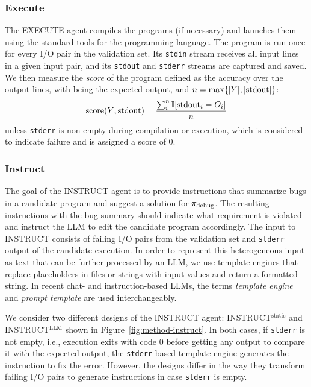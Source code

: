 \subsubsection{Execute}
\label{sec:seidr-execute}


The EXECUTE agent compiles the programs (if necessary) and launches them using the standard tools for the programming language.
The program is run once for every I/O pair in the validation set. 
Its \texttt{stdin} stream receives all input lines in a given input pair, and its \texttt{stdout} and \texttt{stderr} streams are captured and saved.
We then measure the \emph{score} of the program defined as the accuracy over the output lines, with \expoutputvec{} being the expected output, and $n=\max\{|Y{}|, |\text{stdout}|\}$:
\[    
\text{score}(Y{}, \text{stdout}) = \frac{\sum^{n}_i{\mathbb{I}[\text{stdout}_i = O_i]}}{n} 
\]
unless \texttt{stderr} is non-empty during compilation or execution, which is considered to indicate failure and is assigned a score of 0.

\subsubsection{Instruct}
\label{sec:seidr-instruct}

The goal of the INSTRUCT agent is to provide instructions that summarize bugs in a candidate program and suggest a solution for $ \pi_\text{debug} $. 
The resulting instructions with the bug summary should indicate what requirement is violated and instruct the LLM to edit the candidate program accordingly. 
The input to INSTRUCT consists of failing I/O pairs from the validation set and \texttt{stderr} output of the candidate execution. 
In order to represent this heterogeneous input as text that can be further processed by an LLM, we use template engines that replace placeholders in files or strings with input values and return a formatted string. 
In recent chat- and instruction-based LLMs, the terms \emph{template engine} and \emph{prompt template} are used interchangeably.

We consider two different designs of the INSTRUCT agent: INSTRUCT$^{\text{static}}$ and INSTRUCT$^{\text{LLM}}$ shown in Figure~\ref{fig:method-instruct}. 
In both cases, if \texttt{stderr} is not empty, i.e., execution exits with code 0 before getting any output to compare it with the expected output, the \texttt{stderr}-based template engine generates the instruction to fix the error. 
However, the designs differ in the way they transform failing I/O pairs to generate instructions in case \texttt{stderr} is empty.

